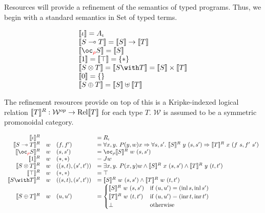 
Resources will provide a refinement of the semantics of typed programs.
Thus, we begin with a standard semantics in $\mathrm{Set}$ of typed terms.

\begin{displaymath}
  \begin{array}{ll}
    \sem{\base} = A_\base \\
    \sem{\fun{S}{T}} = \sem{S} \rightarrow \sem{T} \\
    \sem{\excl{\rho}{S}} = \sem{S} \\
    \sem{\tensorOne} = \sem{\withTOne} = \{*\} \\
    \sem{\tensor{S}{T}} = \sem{\withT{S}{T}} = \sem{S} \times \sem{T} \\
    \sem{\sumTZero} = \{\} \\
    \sem{\sumT{S}{T}} = \sem{S} \uplus \sem{T} \\
  \end{array}
\end{displaymath}

The refinement resources provide on top of this is a Kripke-indexed logical
relation $\llbracket T \rrbracket^R : \mathcal{W}^{op} \to \operatorname{Rel}\llbracket T \rrbracket$ for each type $T$.
$\mathcal{W}$ is assumed to be a symmetric promonoidal category.

\begin{displaymath}
  \begin{array}{rlll}
    \sem{\base}^R && &= R_\base \\
    \sem{\fun{S}{T}}^R & w & (f,f') &= \forall x,y.~P(y,w)x \Rightarrow \forall
    s,s'.~\sem{S}^R~y~(s,s') \Rightarrow \sem{T}^R~x~(f~s,f'~s') \\
    \sem{\excl{\rho}{S}}^R & w & (s,s') &= \oc_\rho \sem{S}^R~w~(s,s') \\
    \sem{\tensorOne}^R & w & (*,*) &= Jw \\
    \sem{\tensor{S}{T}}^R & w & ((s,t),(s',t')) &= \exists x,y.~P(x,y)w \wedge
    \sem{S}^R~x~(s,s') \wedge \sem{T}^R~y~(t,t') \\
    \sem{\withTOne}^R & w & (*,*) &= \top \\
    \sem{\withT{S}{T}}^R & w & ((s,t),(s',t')) &=
    \sem{S}^R~w~(s,s') \wedge \sem{T}^R~w~(t,t') \\
    \sem{\sumT{S}{T}}^R & w & (u,u') &=
    \begin{cases}
      \sem{S}^R~w~(s,s') & \text{if } (u,u') = (\operatorname{inl} s,
                           \operatorname{inl} s') \\
      \sem{T}^R~w~(t,t') & \text{if } (u,u') = (\operatorname{inr} t,
                           \operatorname{inr} t') \\
      \bot & \text{otherwise}
    \end{cases}
  \end{array}
\end{displaymath}